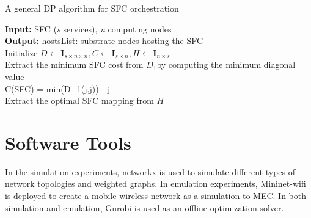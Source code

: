 \begin{algorithm}
	\caption{A general DP algorithm for SFC orchestration}
	\label{alg:DP_SFC}
	\textbf{Input:} SFC (\textit{s} services), \textit{n} computing nodes\\
	\textbf{Output:} hostsList: substrate nodes hosting the SFC\\
	Initialize $D \leftarrow \textbf{I}_{s\times n\times n}, C \leftarrow \textbf{I}_{s\times n}, H \leftarrow \textbf{I}_{n\times s}$\\ 
	\textnormal{Extract the minimum SFC cost from $D_1$by computing the minimum diagonal value }\\
	C(SFC) = \textnormal{min}(D_1(j,j))\ \forall\  j \in [1, n]\\
	Extract the optimal SFC mapping from $H$\\
	
	
\end{algorithm}




\section{Software Tools}
\label{sec:software tools}
In the simulation experiments, networkx\cite{networkx} is used to simulate different types of network topologies and weighted graphs. In emulation experiments, Mininet-wifi\cite{mininetwifi} is deployed to create a mobile wireless network as a simulation to MEC. In both simulation and emulation, Gurobi\cite{gurobi} is used as an offline optimization solver. 

